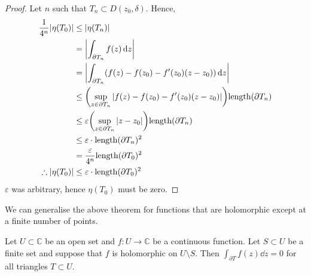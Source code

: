\begin{proof}
	Let \( n \) such that \( T_n \subset D(z_0, \delta) \).
	Hence,
	\begin{align*}
		\frac{1}{4^n} \abs{\eta(T_0)} & \leq \abs{\eta(T_n)}                                                                                    \\
		                              & = \abs{\int_{\partial T_n} f(z) \dd{z}}                                                                 \\
		                              & = \abs{\int_{\partial T_n} (f(z) - f(z_0) - f'(z_0)(z - z_0)) \dd{z}}                                   \\
		                              & \leq \qty(\sup_{z \in \partial T_n} \abs{f(z) - f(z_0) - f'(z_0)(z-z_0)}) \mathrm{length}(\partial T_n) \\
		                              & \leq \varepsilon \qty(\sup_{z \in \partial T_n} \abs{z - z_0}) \mathrm{length}(\partial T_n)            \\
		                              & \leq \varepsilon \cdot \mathrm{length}(\partial T_n)^2                                                  \\
		                              & = \frac{\varepsilon}{4^n} \mathrm{length}(\partial T_0)^2                                               \\
		\therefore \abs{\eta(T_0)}    & \leq \varepsilon \cdot \mathrm{length}(\partial T_0)^2
	\end{align*}
	\( \varepsilon \) was arbitrary, hence \( \eta(T_0) \) must be zero.
\end{proof}
We can generalise the above theorem for functions that are holomorphic except at a finite number of points.
\begin{theorem}
	Let \( U \subset \mathbb C \) be an open set and \( f \colon U \to \mathbb C \) be a continuous function.
	Let \( S \subset U \) be a finite set and suppose that \( f \) is holomorphic on \( U \setminus S \).
	Then \( \int_{\partial T} f(z) \dd{z} = 0 \) for all triangles \( T \subset U \).
\end{theorem}
